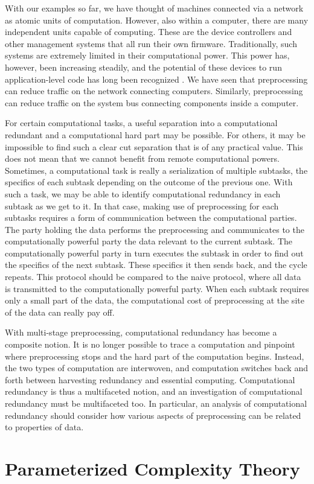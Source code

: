 With our examples so far, we have thought of machines connected via a network as atomic units of computation.
However, also within a computer, there are many independent units capable of computing.
These are the device controllers and other management systems that all run their own firmware.
Traditionally, such systems are extremely limited in their computational power.
This power has, however, been increasing steadily, and the potential of these devices to run application-level code has long been recognized \parencite[for example][]{riedel1998active}.
We have seen that preprocessing can reduce traffic on the network connecting computers.
Similarly, preprocessing can reduce traffic on the system bus connecting components inside a computer.

For certain computational tasks, a useful separation into a computational redundant and a computational hard part may be possible.
For others, it may be impossible to find such a clear cut separation that is of any practical value.
This does not mean that we cannot benefit from remote computational powers.
Sometimes, a computational task is really a serialization of multiple subtasks, the specifics of each subtask depending on the outcome of the previous one.
With such a task, we may be able to identify computational redundancy in each subtask as we get to it.
In that case, making use of preprocessing for each subtasks requires a form of communication between the computational parties.
The party holding the data performs the preprocessing and communicates to the computationally powerful party the data relevant to the current subtask.
The computationally powerful party in turn executes the subtask in order to find out the specifics of the next subtask.
These specifics it then sends back, and the cycle repeats.
This protocol should be compared to the naive protocol, where all data is transmitted to the computationally powerful party.
When each subtask requires only a small part of the data, the computational cost of preprocessing at the site of the data can really pay off.

With multi-stage preprocessing, computational redundancy has become a composite notion.
It is no longer possible to trace a computation and pinpoint where preprocessing stops and the hard part of the computation begins.
Instead, the two types of computation are interwoven, and computation switches back and forth between harvesting redundancy and essential computing.
Computational redundancy is thus a multifaceted notion, and an investigation of computational redundancy must be multifaceted too.
In particular, an analysis of computational redundancy should consider how various aspects of preprocessing can be related to properties of data.


\section{Parameterized Complexity Theory}
\label{sec:parameterized_complexity_theory}%
